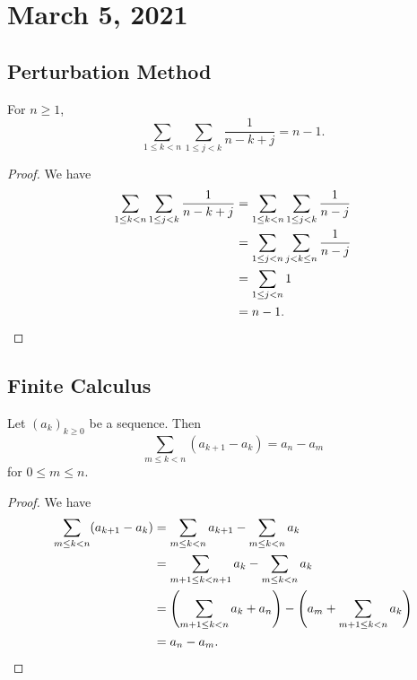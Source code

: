 \documentclass[11pt]{article}
\begin{document}
\section{March 5, 2021}
\subsection{Perturbation Method}
\begin{proposition}
  For $n \geq 1$,
  \begin{equation*}
    \sum_{1 \leq k < n} \sum_{1 \leq j < k} \frac{1}{n-k+j} = n-1.
  \end{equation*}
\end{proposition}
\begin{proof}
  We have
  \begin{align*}
    \sum_{1 \leq k < n} \sum_{1 \leq j < k} \frac{1}{n-k+j}
    &= \sum_{1 \leq k < n} \sum_{1 \leq j < k} \frac{1}{n-j} \\
    &= \sum_{1 \leq j < n} \sum_{j < k \leq n} \frac{1}{n-j} \\
    &= \sum_{1 \leq j < n} 1 \\
    &= n-1.
    \qedhere
  \end{align*}
\end{proof}

\subsection{Finite Calculus}
\begin{theorem}
  Let $(a_k)_{k \geq 0}$ be a sequence.
  Then
  \begin{equation*}
    \sum_{m \leq k < n} (a_{k+1} - a_k) = a_n - a_m
  \end{equation*}
  for $0 \leq m \leq n$.
\end{theorem}
\begin{proof}
  We have
  \begin{align*}
    \sum_{m \leq k < n} (a_{k+1} - a_k)
    &= \sum_{m \leq k < n} a_{k+1} - \sum_{m \leq k < n} a_k \\
    &= \sum_{m+1 \leq k < n+1} a_k - \sum_{m \leq k < n} a_k \\
    &= \Biggl(\sum_{m+1 \leq k < n} a_k + a_n\Biggr) - \Biggl(a_m + \sum_{m+1 \leq k < n} a_k\Biggr) \\
    &= a_n - a_m.
    \qedhere
  \end{align*}
\end{proof}
\end{document}
